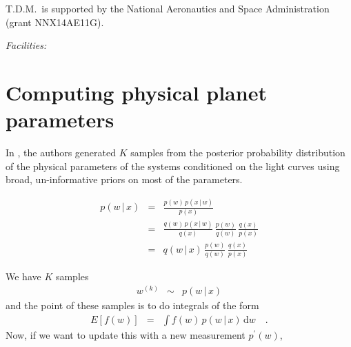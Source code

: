 \documentclass{emulateapj}
\newcommand{\dd}{{\ensuremath{\,\mathrm{d}}}}
\newcommand{\paperit}{\citet{Foreman-Mackey15}}
\newcommand{\todo}[3]{{\color{#2} \emph{#1} TO DO: #3}}
\newcommand{\btmtodo}[1]{\todo{BEN}{red}{#1}}
\begin{document}
T.D.M.~is supported by the National Aeronautics and Space Administration (grant
NNX14AE11G).

{\it Facilities:} %

\appendix
\section{Computing physical planet parameters}

In \paperit, the authors generated $K$ samples from the posterior probability
distribution of the physical parameters of the systems conditioned on the
light curves using broad, un-informative priors on most of the parameters.

\begin{eqnarray}
p(w\,|\,x) &=& \frac{p(w)\,p(x\,|\,w)}{p(x)} \\
&=& \frac{q(w)\,p(x\,|\,w)}{q(x)}\,\frac{p(w)}{q(w)}\,\frac{q(x)}{p(x)} \\
&=& q(w\,|\,x)\,\frac{p(w)}{q(w)}\,\frac{q(x)}{p(x)}
\end{eqnarray}

We have $K$ samples
\begin{eqnarray}
w^{(k)} &\sim& p(w\,|\,x)
\end{eqnarray}
and the point of these samples is to do integrals of the form
\begin{eqnarray}
E[f(w)] &=& \int f(w)\,p(w\,|\,x) \dd w \quad.
\end{eqnarray}
Now, if we want to update this with a new measurement $p^\prime(w)$,









%
\end{document}
